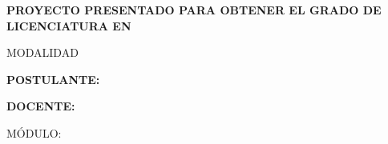 \begin{titlingpage}
\noindent\hspace*{2.5cm}%
\begin{minipage}{\dimexpr\textwidth-2.5cm\relax}
  \setlength{\parindent}{0pt}
  \fontsize{12}{16}\selectfont\bfseries
  PROYECTO PRESENTADO PARA OBTENER EL GRADO DE LICENCIATURA
  EN \MakeUppercase{\nombreLicenciatura}\par
  MODALIDAD \MakeUppercase{\modalidadTitulacion}\par
\end{minipage}\par

\vspace{5\baselineskip}   %

\noindent\hspace*{2.5cm}%
\begin{minipage}{\dimexpr\textwidth-2.5cm\relax}
  \setlength{\parindent}{0pt}
  \fontsize{14}{16}\selectfont\bfseries
  POSTULANTE\hspace{1cm}: \MakeUppercase{\nombrePostulante}\par
\end{minipage}\par

\ifmostrarDocente
  \vspace{\baselineskip}
  \noindent\hspace*{2.5cm}%
  \begin{minipage}{\dimexpr\textwidth-2.5cm\relax}
    \setlength{\parindent}{0pt}
    \fontsize{12}{16}\selectfont\bfseries
    DOCENTE: \MakeUppercase{\nombreDocente}\par
    MÓDULO: \MakeUppercase{\nombreModulo}\par
  \end{minipage}\par
\fi

\vfill

{\centering
  \fontsize{12}{14}\selectfont\bfseries
  \MakeUppercase{\ciudadMonografia}\par
  \anioMonografia\par}

\vspace{2\baselineskip}   %

\end{titlingpage}

\setcounter{page}{2}
